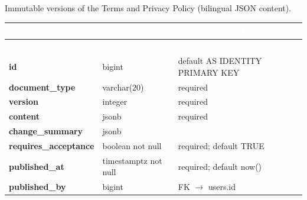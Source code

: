 \subsection*{}
Immutable versions of the Terms and Privacy Policy (bilingual JSON content).\par\vspace{2pt}
{\tabfont\rowband
\begin{longtable}{@{}>{\raggedright\arraybackslash}p{}>{\raggedright\arraybackslash}p{}>{\raggedright\arraybackslash}p{}@{}}
\rowcolor{najdanavy}\textcolor{white}{\sffamily\bfseries\small Column} & \textcolor{white}{\sffamily\bfseries\small Type} & \textcolor{white}{\sffamily\bfseries\small Constraints and notes}\\
\endfirsthead
\rowcolor{najdanavy}\textcolor{white}{\sffamily\bfseries\small Column} & \textcolor{white}{\sffamily\bfseries\small Type} & \textcolor{white}{\sffamily\bfseries\small Constraints and notes}\\
\endhead
\bottomrule\endlastfoot
\textbf{id} & bigint & default AS IDENTITY PRIMARY KEY\\
\textbf{document\_\allowbreak{}type} & varchar(20) & required\\
\textbf{version} & integer & required\\
\textbf{content} & jsonb & required\\
\textbf{change\_\allowbreak{}summary} & jsonb & \\
\textbf{requires\_\allowbreak{}acceptance} & boolean not null & required; default TRUE\\
\textbf{published\_\allowbreak{}at} & timestamptz not null & required; default now()\\
\textbf{published\_\allowbreak{}by} & bigint & FK $\rightarrow$ users.id\\
\end{longtable}}

